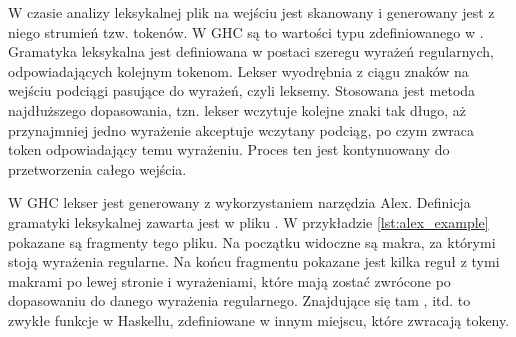 W czasie analizy leksykalnej plik na wejściu jest skanowany i generowany jest
z niego strumień tzw. tokenów. W GHC są to wartości typu 
zdefiniowanego w . Gramatyka leksykalna jest definiowana
w postaci szeregu wyrażeń regularnych, odpowiadających kolejnym tokenom.
Lekser wyodrębnia z ciągu znaków na wejściu podciągi pasujące do wyrażeń,
czyli leksemy. Stosowana jest metoda najdłuższego dopasowania, tzn. lekser
wczytuje kolejne znaki tak długo, aż przynajmniej jedno wyrażenie akceptuje
wczytany podciąg, po czym zwraca token odpowiadający temu wyrażeniu.
Proces ten jest kontynuowany do przetworzenia całego wejścia.


W GHC lekser jest generowany z wykorzystaniem narzędzia Alex. Definicja
gramatyki leksykalnej zawarta jest w pliku . W przykładzie
\ref{lst:alex_example} pokazane są fragmenty tego pliku. Na początku widoczne są
makra, za którymi stoją wyrażenia regularne. Na końcu fragmentu pokazane jest
kilka reguł z tymi makrami po lewej stronie i wyrażeniami, które mają zostać
zwrócone po dopasowaniu do danego wyrażenia regularnego. Znajdujące się tam
,  itd. to zwykłe funkcje w Haskellu, zdefiniowane w
innym miejscu, które zwracają tokeny\cite{DocsAlex}.

